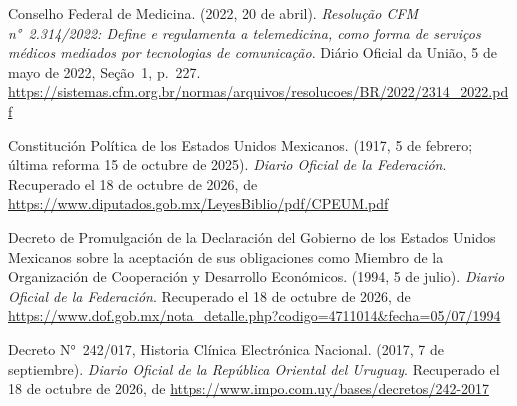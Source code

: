 \documentclass[12pt, a4paper]{article}
\begin{document}
\begin{list}{}{\setlength{\leftmargin}{1.27cm}\setlength{\itemindent}{-1.27cm}%
  \setlength{\labelwidth}{0pt}\setlength{\labelsep}{0pt}\setlength{\itemsep}{6pt}}
\item Conselho Federal de Medicina. (2022, 20 de abril).
  \textit{Resolução CFM n°~2.314/2022: Define e regulamenta a
  telemedicina, como forma de serviços médicos mediados por tecnologias de comunicação}. Diário Oficial da União, 5 de mayo
  de 2022, Seção~1, p.~227. \url{https://sistemas.cfm.org.br/normas/arquivos/resolucoes/BR/2022/2314_2022.pdf}
 
 
\item Constitución Política de los Estados Unidos Mexicanos.
  (1917, 5 de febrero; última reforma 15 de octubre de 2025). \textit{Diario Oficial
  de la Federación}. Recuperado el 18 de octubre de 2026, de \url{https://www.diputados.gob.mx/LeyesBiblio/pdf/CPEUM.pdf}
 
 
\item Decreto de Promulgación de la Declaración del Gobierno de los
  Estados Unidos Mexicanos sobre la aceptación de sus obligaciones como
  Miembro de la Organización de Cooperación y Desarrollo Económicos.
  (1994, 5 de julio). \textit{Diario Oficial de la Federación}.
  Recuperado el 18 de octubre de 2026, de \url{https://www.dof.gob.mx/nota_detalle.php?codigo=4711014&fecha=05/07/1994}
 
  
\item Decreto N°~242/017, Historia Clínica Electrónica Nacional.
  (2017, 7 de septiembre). \textit{Diario Oficial de la República
  Oriental del Uruguay}.
  Recuperado el 18 de octubre de 2026, de \url{https://www.impo.com.uy/bases/decretos/242-2017}



\end{list}
\end{document}
